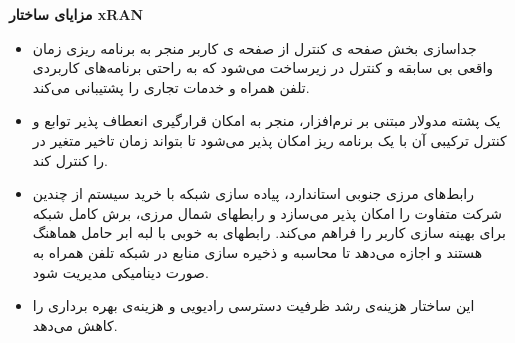 \textbf{مزایای ساختار xRAN}
\begin{itemize}
\item 
جداسازی بخش صفحه ی کنترل از 
صفحه ی کاربر 
منجر به 
برنامه ریزی زمان واقعی بی سابقه و کنترل در زیرساخت  می‌شود که به راحتی برنامه‌های کاربردی تلفن همراه و خدمات تجاری را پشتیبانی می‌کند.
\item
 یک پشته
 مدولار مبتنی بر نرم‌افزار، منجر به امکان قرارگیری انعطاف پذیر توابع  و کنترل ترکیبی آن با یک برنامه ریز امکان پذیر می‌شود تا بتواند زمان تاخیر متغیر در  را کنترل کند.
\item
رابط‌های مرزی جنوبی استاندارد، پیاده سازی شبکه با خرید سیستم از چندین شرکت متفاوت را امکان پذیر می‌سازد و رابطهای شمال مرزی، برش کامل شبکه برای بهینه سازی   کاربر را فراهم می‌کند.
رابطهای  به خوبی با لبه ابر حامل هماهنگ هستند و اجازه می‌دهد تا محاسبه و ذخیره سازی منابع در شبکه تلفن همراه 
به صورت دینامیکی مدیریت شود.
\item 
این ساختار هزینه‌ی رشد ظرفیت دسترسی رادیویی و هزینه‌ی بهره برداری را کاهش می‌دهد.
\end{itemize}
